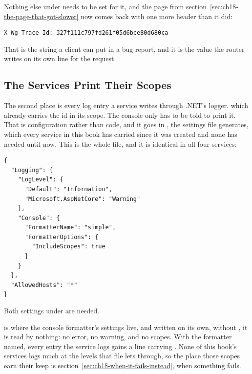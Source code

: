 %
Nothing else under  needs to be set for it, and the page from
section~\ref{sec:ch18-the-page-that-got-slower} now comes back with one more
header than it did:

\begin{verbatim}
X-Wg-Trace-Id: 327f111c797fd261f05d6bce80d680ca
\end{verbatim}

That is the string a client can put in a bug report, and it is the value the
router writes on its own line for the request.
%

\subsection{The Services Print Their Scopes}

%
The second place is every log entry a service writes through .NET's logger,
which already carries the id in its scope. The console only has to be told to
print it. That is configuration rather than code, and it goes in
, the settings file  generates,
which every service in this book has carried since it was created and none
has needed until now. This is the whole file, and it is identical in all four services:

\begin{verbatim}
{
  "Logging": {
    "LogLevel": {
      "Default": "Information",
      "Microsoft.AspNetCore": "Warning"
    },
    "Console": {
      "FormatterName": "simple",
      "FormatterOptions": {
        "IncludeScopes": true
      }
    }
  },
  "AllowedHosts": "*"
}
\end{verbatim}

%
Both settings under  are needed.

 is where the console formatter's settings live, and
written on its own, without , it is read by nothing: no
error, no warning, and no scopes. With the formatter named, every entry the
service logs gains a line carrying . None of this book's services
logs much at the levels that file lets through, so the place those scopes earn their keep is
section~\ref{sec:ch18-when-it-fails-instead}, when something fails.
%

